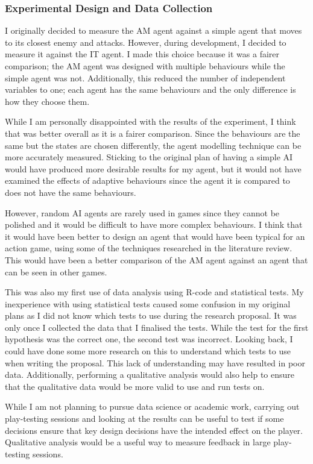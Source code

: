 \documentclass{IEEEtran}
\begin{document}
\subsubsection{Experimental Design and Data Collection}

I originally decided to measure the AM agent against a simple agent that moves to its closest enemy and attacks. However, during development, I decided to measure it against the IT agent. I made this choice because it was a fairer comparison; the AM agent was designed with multiple behaviours while the simple agent was not. Additionally, this reduced the number of independent variables to one; each agent has the same behaviours and the only difference is how they choose them.

While I am personally disappointed with the results of the experiment, I think that was better overall as it is a fairer comparison. Since the behaviours are the same but the states are chosen differently, the agent modelling technique can be more accurately measured. Sticking to the original plan of having a simple AI would have produced more desirable results for my agent, but it would not have examined the effects of adaptive behaviours since the agent it is compared to does not have the same behaviours.

However, random AI agents are rarely used in games since they cannot be polished and it would be difficult to have more complex behaviours. I think that it would have been better to design an agent that would have been typical for an action game, using some of the techniques researched in the literature review. This would have been a better comparison of the AM agent against an agent that can be seen in other games.

This was also my first use of data analysis using R-code and statistical tests. My inexperience with using statistical tests caused some confusion in my original plans as I did not know which tests to use during the research proposal. It was only once I collected the data that I finalised the tests. While the test for the first hypothesis was the correct one, the second test was incorrect. Looking back, I could have done some more research on this to understand which tests to use when writing the proposal. This lack of understanding may have resulted in poor data. Additionally, performing a qualitative analysis would also help to ensure that the qualitative data would be more valid to use and run tests on.

While I am not planning to pursue data science or academic work, carrying out play-testing sessions and looking at the results can be useful to test if some decisions ensure that key design decisions have the intended effect on the player. Qualitative analysis would be a useful way to measure feedback in large play-testing sessions.
\end{document}
